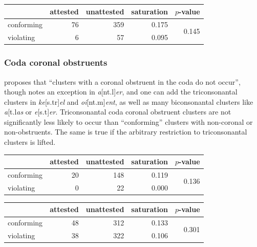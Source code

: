 \begin{example}
\begin{tabular}{l r r r r}
\toprule
           & attested & unattested & saturation & $p$-value \\
\midrule
conforming & 76 & 359 & 0.175 & \multirow{2}{*}{0.145} \\
violating  &  6 &  57 & 0.095 \\
\bottomrule
\end{tabular}
\end{example}

\subsubsection{Coda coronal obstruents}

\citet[][175]{Pierrehumbert1994} proposes that ``clusters with a coronal obstruent in the coda do not occur'', though \citet{Pierrehumbert1994} notes an exception in \emph{a}[nt.l]\emph{er}, and one can add the triconsonantal clusters in \emph{ke}[s.tr]\emph{el} and \emph{oi}[nt.m]\emph{ent}, as well as many biconsonantal clusters like \emph{a}[t.l\emph{as} or \emph{e}[s.t]\emph{er}. Triconsonantal coda coronal obstruent clusters are not significantly less likely to occur than ``conforming'' clusters with non-coronal or non-obstruents. The same is true if the arbitrary restriction to triconsonantal clusters is lifted.

\begin{example}
\begin{tabular}{l r r r r}
\toprule
           & attested & unattested & saturation & $p$-value              \\
\midrule
conforming & 20       & 148        & 0.119      & \multirow{2}{*}{0.136} \\
violating  & 0        & 22         & 0.000                               \\
\bottomrule
\end{tabular}
\end{example}

\begin{example}
\begin{tabular}{l r r r r}
\toprule
           & attested & unattested & saturation & $p$-value              \\
\midrule
conforming & 48       & 312        & 0.133      & \multirow{2}{*}{0.301} \\
violating  & 38       & 322        & 0.106                               \\
\bottomrule
\end{tabular}
\end{example}

